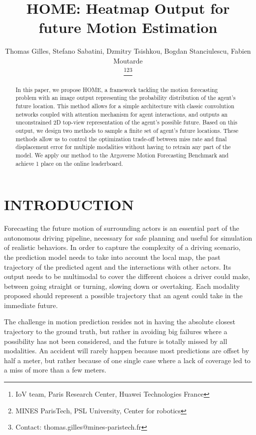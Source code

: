 \documentclass[letterpaper, 10 pt, conference]{ieeeconf}
\title{\LARGE \bf
HOME: Heatmap Output for future Motion Estimation
}
\author{Thomas Gilles, Stefano Sabatini, Dzmitry Tsishkou, Bogdan Stanciulescu, Fabien Moutarde

\thanks{IoV team, Paris Research Center, Huawei Technologies France}\thanks{MINES ParisTech, PSL University, Center for robotics}\thanks{Contact: thomas.gilles@mines-paristech.fr}}
\begin{document}
\maketitle
\thispagestyle{empty}
\pagestyle{empty}


\begin{abstract}

In this paper, we propose HOME, a framework tackling the motion forecasting problem with an image output representing the probability distribution of the agent's future location. This method allows for a simple architecture with classic convolution networks coupled with attention mechanism for agent interactions, and outputs an unconstrained 2D top-view representation of the agent's possible future. Based on this output, we design two methods to sample a finite set of agent's future locations. These methods allow us to control the optimization trade-off between miss rate and final displacement error for multiple modalities without having to retrain any part of the model. We apply our method to the Argoverse Motion Forecasting Benchmark and achieve 1 place on the online leaderboard.


\end{abstract}




\section{INTRODUCTION}

Forecasting the future motion of surrounding actors is an essential part of the autonomous driving pipeline, necessary for safe planning and useful for simulation of realistic behaviors. In order to capture the complexity of a driving scenario, the prediction model needs to take into account the local map, the past trajectory of the predicted agent and the interactions with other actors. Its output needs to be multimodal to cover the different choices a driver could make, between going straight or turning, slowing down or overtaking. Each modality proposed should represent a possible trajectory that an agent could take in the immediate future.

The challenge in motion prediction resides not in having the absolute closest trajectory to the ground truth, but rather in avoiding big failures where a possibility has not been considered, and the future is totally missed by all modalities. An accident will rarely happen because most predictions are offset by half a meter, but rather because of one single case where a lack of coverage led to a miss of more than a few meters.
\end{document}
